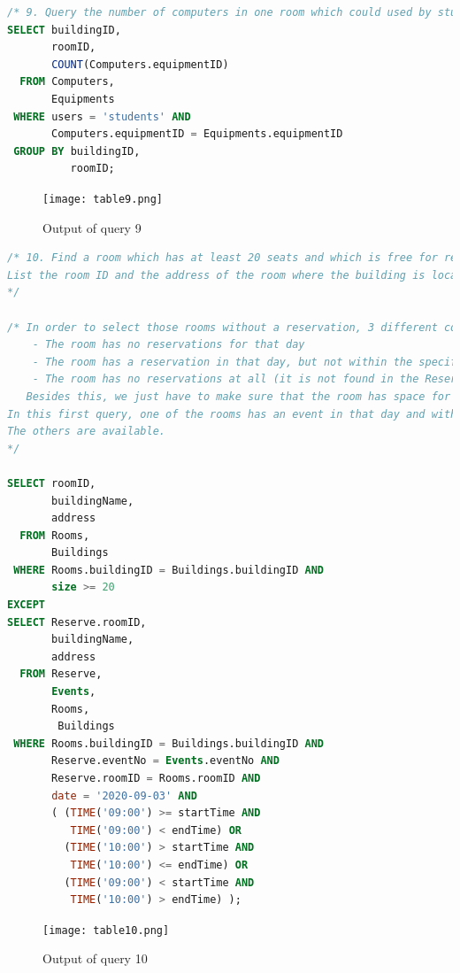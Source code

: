 \documentclass{article}
\begin{document}
\begin{lstlisting}[language=SQL]
/* 9. Query the number of computers in one room which could used by students to have a lecture or exam */
SELECT buildingID,
       roomID,
       COUNT(Computers.equipmentID) 
  FROM Computers,
       Equipments
 WHERE users = 'students' AND 
       Computers.equipmentID = Equipments.equipmentID
 GROUP BY buildingID,
          roomID;
\end{lstlisting}

\begin{figure}[!h]
	\centering
	\texttt{[image: table9.png]}
	\caption{Output of query 9}
	\label{fig:9}
\end{figure}

\begin{lstlisting}[language=SQL]
/* 10. Find a room which has at least 20 seats and which is free for reservation at a certain time (2020-09-03 at 9:00 to 10:00).
List the room ID and the address of the room where the building is located.
*/ 

/* In order to select those rooms without a reservation, 3 different conditions can occur:
    - The room has no reservations for that day
    - The room has a reservation in that day, but not within the specified times
    - The room has no reservations at all (it is not found in the Reserve relation).
   Besides this, we just have to make sure that the room has space for more than 20 people.
In this first query, one of the rooms has an event in that day and within the given timeframe.
The others are available.
*/

SELECT roomID,
       buildingName,
       address
  FROM Rooms,
       Buildings
 WHERE Rooms.buildingID = Buildings.buildingID AND 
       size >= 20
EXCEPT
SELECT Reserve.roomID,
       buildingName,
       address
  FROM Reserve,
       Events,
       Rooms,
        Buildings
 WHERE Rooms.buildingID = Buildings.buildingID AND 
       Reserve.eventNo = Events.eventNo AND 
       Reserve.roomID = Rooms.roomID AND 
       date = '2020-09-03' AND 
       ( (TIME('09:00') >= startTime AND 
          TIME('09:00') < endTime) OR 
         (TIME('10:00') > startTime AND 
          TIME('10:00') <= endTime) OR 
         (TIME('09:00') < startTime AND 
          TIME('10:00') > endTime) );
\end{lstlisting}

\begin{figure}[!h]
	\centering
	\texttt{[image: table10.png]}
	\caption{Output of query 10}
	\label{fig:10}
\end{figure}
\end{document}
